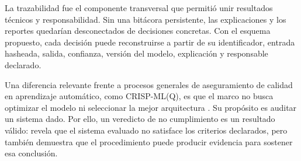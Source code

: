 La trazabilidad fue el componente transversal que permitió unir resultados
técnicos y responsabilidad. Sin una bitácora persistente, las explicaciones y
los reportes quedarían desconectados de decisiones concretas. Con el esquema
propuesto, cada decisión puede reconstruirse a partir de su identificador,
entrada hasheada, salida, confianza, versión del modelo, explicación y
responsable declarado.

Una diferencia relevante frente a procesos generales de aseguramiento de calidad
en aprendizaje automático, como CRISP-ML(Q), es que el marco no busca optimizar
el modelo ni seleccionar la mejor arquitectura \cite{studer2021crispmlq}. Su
propósito es auditar un sistema dado. Por ello, un veredicto de no cumplimiento
es un resultado válido: revela que el sistema evaluado no satisface los
criterios declarados, pero también demuestra que el procedimiento puede
producir evidencia para sostener esa conclusión.
